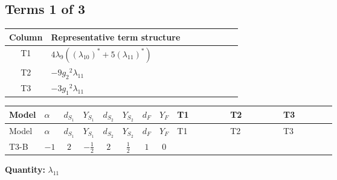 \documentclass[8pt]{article}
\begin{document}
\begin{landscape}
\subsection*{Terms 1 of 3}
\begin{center}
\begin{tabular}{@{}c >{\raggedright\arraybackslash}p{0.82\linewidth}@{}}
\toprule
Column & Representative term structure \\
\midrule
T1 & \(\displaystyle 4 {\lambda_9} (\left({\lambda_{10}}\right)^{*}+5 \left({\lambda_{11}}\right)^{*})\) \\
\midrule
T2 & \(\displaystyle -9 {g_2}^2 {\lambda_{11}}\) \\
\midrule
T3 & \(\displaystyle -3 {g_1}^2 {\lambda_{11}}\) \\
\midrule
\bottomrule
\end{tabular}
\end{center}
\smallskip
\tiny
\begin{longtable}{@{}llcccccc >{\raggedright\arraybackslash}p{0.21\linewidth} >{\raggedright\arraybackslash}p{0.21\linewidth} >{\raggedright\arraybackslash}p{0.21\linewidth}@{}}
\toprule
Model & $\alpha$ & $d_{S_1}$ & $Y_{S_1}$ & $d_{S_2}$ & $Y_{S_2}$ & $d_F$ & $Y_F$ & T1 & T2 & T3 \\
\midrule
\endfirsthead
\toprule
Model & $\alpha$ & $d_{S_1}$ & $Y_{S_1}$ & $d_{S_2}$ & $Y_{S_2}$ & $d_F$ & $Y_F$ & T1 & T2 & T3 \\
\midrule
\endhead
T3-B & $-1$ & $2$ & $-\frac{1}{2}$ & $2$ & $\frac{1}{2}$ & $1$ & $0$ & \scriptsize\adjustbox{max width=\linewidth}{$\begin{gathered} 4 {\lambda_9} (\left({\lambda_{10}}\right)^{*}+5 \left({\lambda_{11}}\right)^{*})\end{gathered}$} & \scriptsize\adjustbox{max width=\linewidth}{$\begin{gathered} -9 {g_2}^2 {\lambda_{11}}\end{gathered}$} & \scriptsize\adjustbox{max width=\linewidth}{$\begin{gathered} -3 {g_1}^2 {\lambda_{11}}\end{gathered}$} \\
\midrule
\bottomrule
\end{longtable}
\clearpage
\noindent\textbf{Quantity: }$\lambda_{11}$\par\smallskip

\end{landscape}
\end{document}

